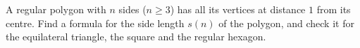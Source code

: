 A regular polygon with $n$ sides ($n\ge3$) has all its vertices at distance $1$ from its centre. Find a formula for the side length $s(n)$ of the polygon, and check it for the equilateral triangle, the square and the regular hexagon.
